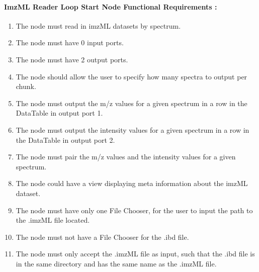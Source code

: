 \documentclass[11pt,openany]{book}
\newenvironment{titlemize}[1]{%
  \paragraph{#1}
  \begin{enumerate}}
  {\end{enumerate}}
\begin{document}
\begin{titlemize}{ImzML Reader Loop Start Node Functional Requirements :}
    \item The node must read in imzML datasets by spectrum.
    \item The node must have 0 input ports.
    \item The node must have 2 output ports.
    \item The node should allow the user to specify how many spectra to output per chunk.
    \item The node must output the m/z values for a given spectrum in a row in the DataTable in output port 1.
    \item The node must output the intensity values for a given spectrum in a row in the DataTable in output port 2.
    \item The node must pair the m/z values and the intensity values for a given spectrum.
    \item The node could have a view displaying meta information about the imzML dataset.
    \item The node must have only one File Chooser, for the user to input the path to the .imzML file located.
    \item The node must not have a File Chooser for the .ibd file.
    \item The node must only accept the .imzML file as input, such that the .ibd file is in the same directory and has the same name as the .imzML file.
\end{titlemize}
\end{document}

